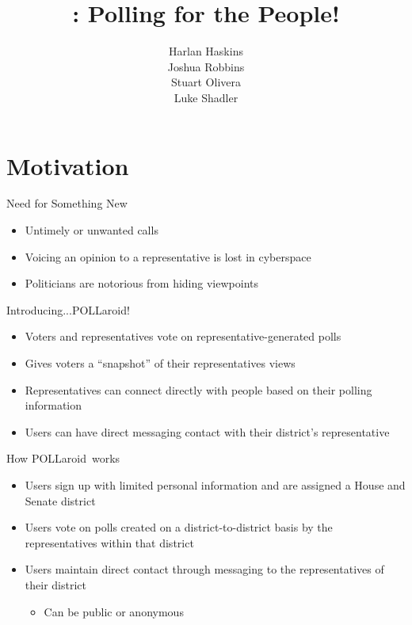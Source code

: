 \documentclass[11pt,aps,prb,groupedaddress,nofootinbib,floatfix]{beamer}
\author{Harlan Haskins\\Joshua Robbins\\Stuart Olivera\\Luke Shadler}
\title{\pollaroid : Polling for the People!}
\institute{Rochester Institute of Technology}
\newcommand{\pollaroid}{POLLaroid}
\begin{document}
\begin{frame}
\titlepage
\end{frame}


\section{Motivation}


%
%
\begin{frame}{Need for Something New}
\begin{itemize}
	\item Untimely or unwanted calls
	\item Voicing an opinion to a representative is lost in cyberspace
	\item Politicians are notorious from hiding viewpoints
\end{itemize}
\end{frame}

%
%
\begin{frame}{Introducing...\pollaroid!}
\begin{itemize}
	\item Voters and representatives vote on representative-generated polls
	\item Gives voters a ``snapshot'' of their representatives views
	\item Representatives can connect directly with people based on their polling information
	\item Users can have direct messaging contact with their district's representative
\end{itemize}
\end{frame}

%
%
\begin{frame}{How \pollaroid\  works}
\begin{itemize}
	\item Users sign up with limited personal information and are assigned a House and Senate district
	\item Users vote on polls created on a district-to-district basis by the representatives within that district
	\item Users maintain direct contact through messaging to the representatives of their district
	\begin{itemize}
		\item Can be public or anonymous
	\end{itemize}
\end{itemize}
\end{frame}
\end{document}
